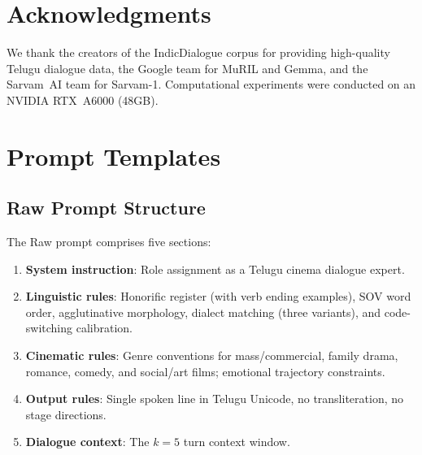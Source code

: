 \documentclass[11pt]{article}
\begin{document}
\section*{Acknowledgments}

We thank the creators of the IndicDialogue corpus for providing high-quality Telugu dialogue data, the Google team for MuRIL and Gemma, and the Sarvam~AI team for Sarvam-1. Computational experiments were conducted on an NVIDIA RTX~A6000 (48GB).




\appendix

\section{Prompt Templates}
\label{sec:appendix-prompts}

\subsection{Raw Prompt Structure}
\label{subsec:appendix-raw}

The Raw prompt comprises five sections:

\begin{enumerate}[leftmargin=*,itemsep=1pt]
    \item \textbf{System instruction}: Role assignment as a Telugu cinema dialogue expert.
    \item \textbf{Linguistic rules}: Honorific register (with verb ending examples), SOV word order, agglutinative morphology, dialect matching (three variants), and code-switching calibration.
    \item \textbf{Cinematic rules}: Genre conventions for mass/commercial, family drama, romance, comedy, and social/art films; emotional trajectory constraints.
    \item \textbf{Output rules}: Single spoken line in Telugu Unicode, no transliteration, no stage directions.
    \item \textbf{Dialogue context}: The $k{=}5$ turn context window.
\end{enumerate}
\end{document}
